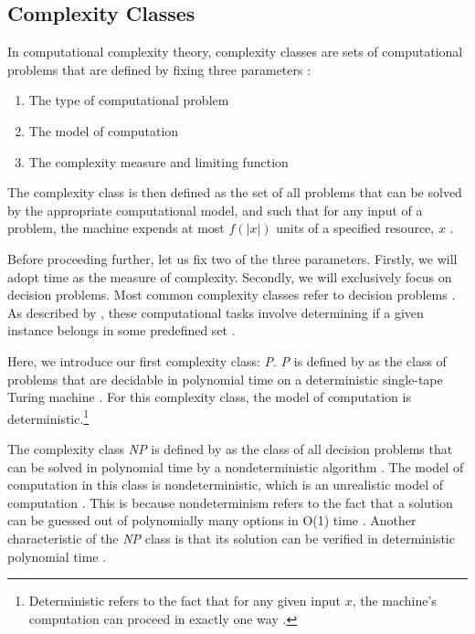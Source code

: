 \documentclass[a4paper, 12pt]{extreport}
\begin{document}
			\subsection{Complexity Classes}
				
				In computational complexity theory, complexity classes are sets of computational problems that are defined by fixing three parameters \cite{cc:conceptual-perspective}:
				\begin{enumerate}
					\item The type of computational problem
					\item The model of computation
					\item The complexity measure and limiting function
				\end{enumerate}
				
				The complexity class is then defined as the set of all problems that can be solved by the appropriate computational model, and such that for any input of a problem, the machine expends at most $f(|x|)$ units of a specified resource, $x$ \cite{comp-complexity-papa}.
				
				Before proceeding further, let us fix two of the three parameters. Firstly, we will adopt time as the measure of complexity. Secondly, we will exclusively focus on decision problems. Most common complexity classes refer to decision problems \cite{goldreich-p-np-np-comp}.	As described by \citeauthor{goldreich-p-np-np-comp}, these computational tasks involve determining if a given instance belongs in some predefined set \cite{goldreich-p-np-np-comp}.
				
				Here, we introduce our first complexity class: \textit{P}. \textit{P} is defined by \citeauthor{sipser-intro-to-computation} as the class of problems that are decidable in polynomial time on a deterministic single-tape Turing machine \cite{sipser-intro-to-computation}. For this complexity class, the model of computation is deterministic.\footnote{Deterministic refers to the fact that for any given input $x$, the machine's computation can proceed in exactly one way \cite{sipser-intro-to-computation}.}
				
				The complexity class \textit{NP} is defined by \citeauthor{computers-and-intractability} as the class of all decision problems that can be solved in polynomial time by a nondeterministic algorithm \cite{computers-and-intractability}. The model of computation in this class is nondeterministic, which is an unrealistic model of computation \cite{comp-complexity-papa}. This is because nondeterminism refers to the fact that a solution can be guessed out of polynomially many options in O(1) time \cite{npcompleteness}. Another characteristic of the \textit{NP} class is that its solution can be verified in deterministic polynomial time \cite{sipser-intro-to-computation}.
				
\end{document}
